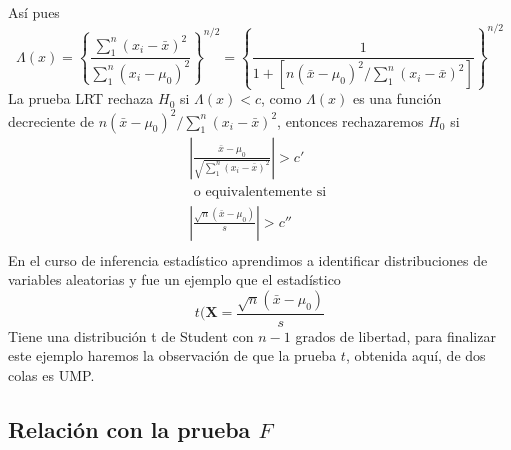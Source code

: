 \documentclass[peerreview]{IEEEtran}
\begin{document}
Así pues 
\[
\Lambda(x) =\left\{ \frac{\sum_1^n(x_i-\bar{x})^2}{\sum_1^n(x_i-\mu_0)^2} \right\}^{n/2} = \left\{ \frac{1}{   1+[n(\bar{x}-\mu_0)^2/\sum_1^n(x_i-\bar{x})^2  ]} \right\}^{n/2}
\]
La prueba LRT rechaza $H_0$ si $\Lambda (x) <c $, como  $\Lambda (x)$ es una función decreciente de $n(\bar{x}-\mu_0)^2/\sum_1^n(x_i-\bar{x})^2$, entonces rechazaremos $H_0$ si  
\[
\begin{split}
	\left| \frac{\bar{x}-\mu_0}{\sqrt{\sum_1^n(x_i-\bar{x})^2}}\right| > c'\\
    \textrm{ o equivalentemente si } \\
    	\left| \frac{\sqrt{n}(\bar{x}-\mu_0)}{s}\right| > c''\\
\end{split}
\]
En el curso de inferencia estadístico aprendimos a identificar distribuciones de variables aleatorias y fue un ejemplo que el estadístico 
\[
t(\mathbf{X} = \frac{\sqrt{n}(\bar{x}-\mu_0)}{s}
\]
Tiene una distribución t de Student con $n-1$ grados de libertad, para finalizar este ejemplo haremos la observación de que la prueba $t$, obtenida aquí, de dos colas es UMP.
\subsection{Relación con la prueba $F$}
\end{document}
